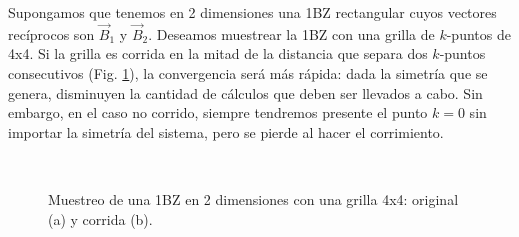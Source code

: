   Supongamos que tenemos en 2 dimensiones una 1BZ rectangular cuyos vectores recíprocos son $\vec{B}_1$ y $\vec{B}_2$. Deseamos muestrear la 1BZ con una grilla de $k$-puntos de 4x4. Si la grilla es corrida en la mitad de la distancia que separa dos $k$-puntos consecutivos (Fig. \ref{fig:shift}), la convergencia será más rápida: dada la simetría que se genera, disminuyen la cantidad de cálculos que deben ser llevados a cabo. Sin embargo, en el caso no corrido, siempre tendremos presente el punto $k=0$ sin importar la simetría del sistema, pero se pierde al hacer el corrimiento.


  \begin{figure}[H]
      \centering
       \\
      \caption{Muestreo de una 1BZ en 2 dimensiones con una grilla 4x4: original (a) y corrida (b).}
      \label{fig:shift}
  \end{figure}

